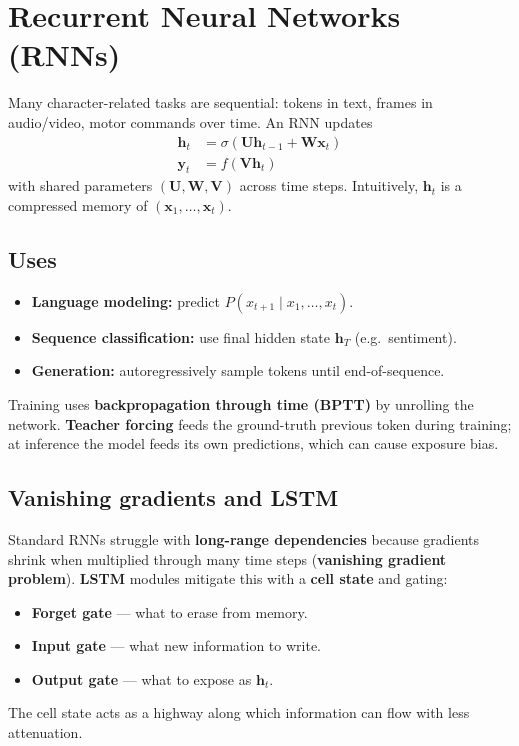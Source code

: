 \section{Recurrent Neural Networks (RNNs)}


Many character-related tasks are sequential: tokens in text, frames in audio/video, motor commands over time. An RNN updates
\begin{align*}
\mathbf{h}_t &= \sigma(\mathbf{U}\mathbf{h}_{t-1} + \mathbf{W}\mathbf{x}_t) \\
\mathbf{y}_t &= f(\mathbf{V}\mathbf{h}_t)
\end{align*}
with shared parameters $(\mathbf{U}, \mathbf{W}, \mathbf{V})$ across time steps. Intuitively, $\mathbf{h}_t$ is a compressed memory of $(\mathbf{x}_1,\ldots,\mathbf{x}_t)$.

\subsection{Uses}

\begin{itemize}
  \item \textbf{Language modeling:} predict $P(x_{t+1}\mid x_1,\ldots,x_t)$.
  \item \textbf{Sequence classification:} use final hidden state $\mathbf{h}_T$ (e.g.\ sentiment).
  \item \textbf{Generation:} autoregressively sample tokens until end-of-sequence.
\end{itemize}

Training uses \textbf{backpropagation through time (BPTT)} by unrolling the network. \textbf{Teacher forcing} feeds the ground-truth previous token during training; at inference the model feeds its own predictions, which can cause exposure bias.

\subsection{Vanishing gradients and LSTM}

Standard RNNs struggle with \textbf{long-range dependencies} because gradients shrink when multiplied through many time steps (\textbf{vanishing gradient problem}). \textbf{LSTM} modules mitigate this with a \textbf{cell state} and gating:
\begin{itemize}
  \item \textbf{Forget gate} --- what to erase from memory.
  \item \textbf{Input gate} --- what new information to write.
  \item \textbf{Output gate} --- what to expose as $\mathbf{h}_t$.
\end{itemize}
The cell state acts as a highway along which information can flow with less attenuation.

